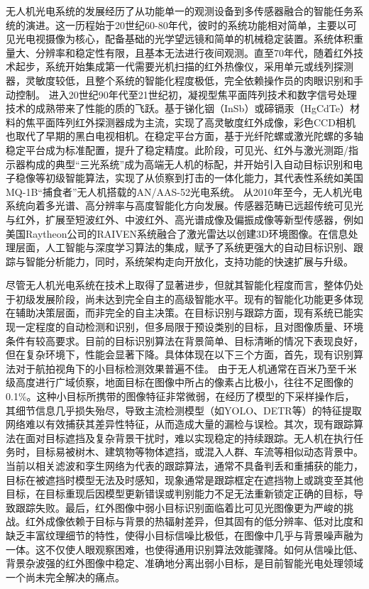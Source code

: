 无人机光电系统的发展经历了从功能单一的观测设备到多传感器融合的智能任务系统的演进。这一历程始于20世纪60-80年代，彼时的系统功能相对简单，主要以可见光电视摄像为核心，配备基础的光学望远镜和简单的机械稳定装置。系统体积重量大、分辨率和稳定性有限，且基本无法进行夜间观测。直至70年代，随着红外技术起步，系统开始集成第一代需要光机扫描的红外热像仪，采用单元或线列探测器，灵敏度较低，且整个系统的智能化程度极低，完全依赖操作员的肉眼识别和手动控制。 进入20世纪90年代至21世纪初，凝视型焦平面阵列技术和数字信号处理技术的成熟带来了性能的质的飞跃。基于锑化铟（InSb）或碲镉汞（HgCdTe）材料的焦平面阵列红外探测器成为主流，实现了高灵敏度红外成像，彩色CCD相机也取代了早期的黑白电视相机。在稳定平台方面，基于光纤陀螺或激光陀螺的多轴稳定平台成为标准配置，提升了稳定精度。此阶段，可见光、红外与激光测距/指示器构成的典型“三光系统”成为高端无人机的标配，并开始引入自动目标识别和电子稳像等初级智能算法，实现了从侦察到打击的一体化能力，其代表性系统如美国MQ-1B“捕食者”无人机搭载的AN/AAS-52光电系统。 从2010年至今，无人机光电系统向着多光谱、高分辨率与高度智能化方向发展。传感器范畴已远超传统可见光与红外，扩展至短波红外、中波红外、高光谱成像及偏振成像等新型传感器，例如美国Raytheon公司的RAIVEN系统融合了激光雷达以创建3D环境图像。在信息处理层面，人工智能与深度学习算法的集成，赋予了系统更强大的自动目标识别、跟踪与智能分析能力，同时，系统架构走向开放化，支持功能的快速扩展与升级。

尽管无人机光电系统在技术上取得了显著进步，但就其智能化程度而言，整体仍处于初级发展阶段，尚未达到完全自主的高级智能水平。现有的智能化功能更多体现在辅助决策层面，而非完全的自主决策。在目标识别与跟踪方面，现有系统已能实现一定程度的自动检测和识别，但多局限于预设类别的目标，且对图像质量、环境条件有较高要求。目前的目标识别算法在背景简单、目标清晰的情况下表现良好，但在复杂环境下，性能会显著下降。具体体现在以下三个方面，首先，现有识别算法对于航拍视角下的小目标检测效果普遍不佳。 由于无人机通常在百米乃至千米级高度进行广域侦察，地面目标在图像中所占的像素占比极小，往往不足图像的0.1\%。这种小目标所携带的图像特征非常微弱，在经历了模型的下采样操作后，其细节信息几乎损失殆尽，导致主流检测模型（如YOLO、DETR等）的特征提取网络难以有效捕获其差异性特征，从而造成大量的漏检与误检。其次，现有跟踪算法在面对目标遮挡及复杂背景干扰时，难以实现稳定的持续跟踪。无人机在执行任务时，目标易被树木、建筑物等物体遮挡，或混入人群、车流等相似动态背景中。当前以相关滤波和孪生网络为代表的跟踪算法，通常不具备判丢和重捕获的能力，目标在被遮挡时模型无法及时感知，现象通常是跟踪框定在遮挡物上或跳变至其他目标，在目标重现后因模型更新错误或判别能力不足无法重新锁定正确的目标，导致跟踪失败。最后，红外图像中弱小目标识别面临着比可见光图像更为严峻的挑战。红外成像依赖于目标与背景的热辐射差异，但其固有的低分辨率、低对比度和缺乏丰富纹理细节的特性，使得小目标信噪比极低，在图像中几乎与背景噪声融为一体。这不仅使人眼观察困难，也使得通用识别算法效能骤降。如何从信噪比低、背景杂波强的红外图像中稳定、准确地分离出弱小目标，是目前智能光电处理领域一个尚未完全解决的痛点。
	
